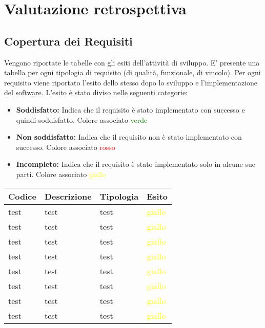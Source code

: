 
\chapter{Valutazione retrospettiva} %

\label{Chapter4} %



\section{Copertura dei Requisiti}

Vengono riportate le tabelle con gli esiti dell'attività di sviluppo. E' presente una
tabella per ogni tipologia di requisito (di qualità, funzionale, di vincolo). Per ogni
requisito viene riportato l'esito dello stesso dopo lo sviluppo e l'implementazione del
software. L'esito è stato diviso nelle seguenti categorie:
\begin{itemize}
\item \textbf{Soddisfatto:} Indica che il requisito è stato implementato con successo e quindi
soddisfatto. Colore associato \textcolor{green}{verde}
\item \textbf{Non soddisfatto:} Indica che il requisito non è stato implementato con successo.
Colore associato \textcolor{red}{rosso}
\item \textbf{Incompleto:} Indica che il requisito è stato implementato solo in alcune sue
parti. Colore associato \textcolor{yellow}{giallo}
\end{itemize}

\begin{center}
    \begin{tabular}{ | l | l | l | p{5cm} |}
    \hline
    Codice & Descrizione & Tipologia & Esito \\ \hline
    test & test & test & \textcolor{yellow}{giallo} \\ \hline
    test & test & test & \textcolor{yellow}{giallo} \\ \hline
    test & test & test & \textcolor{yellow}{giallo} \\ \hline
    test & test & test & \textcolor{yellow}{giallo} \\ \hline
    test & test & test & \textcolor{yellow}{giallo} \\ \hline
    test & test & test & \textcolor{yellow}{giallo} \\ \hline
    test & test & test & \textcolor{yellow}{giallo} \\ \hline
    test & test & test & \textcolor{yellow}{giallo} \\ \hline
    

    \hline
    \end{tabular}
\end{center}


